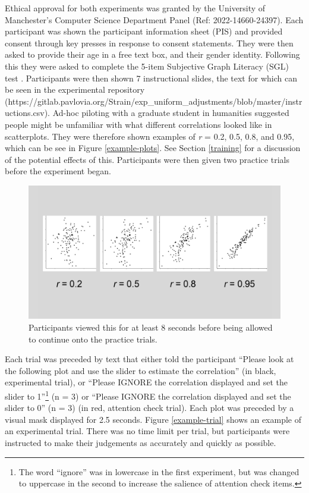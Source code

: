 \documentclass[preprint, 3p,
authoryear]{elsarticle} %
\begin{document}
Ethical approval for both experiments was granted by the University of
Manchester's Computer Science Department Panel (Ref: 2022-14660-24397).
Each participant was shown the participant information sheet (PIS) and
provided consent through key presses in response to consent statements.
They were then asked to provide their age in a free text box, and their
gender identity. Following this they were asked to complete the 5-item
Subjective Graph Literacy (SGL) test \citep{garcia_2016}. Participants
were then shown 7 instructional slides, the text for which can be seen
in the experimental repository
(https://gitlab.pavlovia.org/Strain/exp\_uniform\_adjustments/blob/master/instructions.csv).
Ad-hoc piloting with a graduate student in humanities suggested people
might be unfamiliar with what different correlations looked like in
scatterplots. They were therefore shown examples of \emph{r} = 0.2, 0.5,
0.8, and 0.95, which can be see in Figure \ref{example-plots}. See
Section \ref{training} for a discussion of the potential effects of
this. Participants were then given two practice trials before the
experiment began.

\begin{figure}

\includegraphics[width=0.5\linewidth]{images/example-plots} \hfill{}

\caption{\label{example-plots}Participants viewed this for at least 8 seconds before being allowed to continue onto the practice trials.}\label{fig:example-plots}
\end{figure}

Each trial was preceded by text that either told the participant
``Please look at the following plot and use the slider to estimate the
correlation'' (in black, experimental trial), or ``Please IGNORE the
correlation displayed and set the slider to 1''\footnote{The word
  ``ignore'' was in lowercase in the first experiment, but was changed
  to uppercase in the second to increase the salience of attention check
  items.} (n = 3) or ``Please IGNORE the correlation displayed and set
the slider to 0'' (n = 3) (in red, attention check trial). Each plot was
preceded by a visual mask displayed for 2.5 seconds. Figure
\ref{example-trial} shows an example of an experimental trial. There was
no time limit per trial, but participants were instructed to make their
judgements as accurately and quickly as possible.
\end{document}

